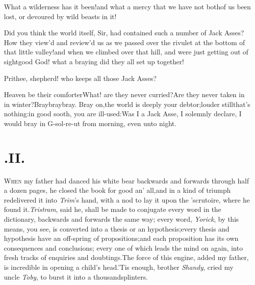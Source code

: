 \documentclass{article}
\begin{document}
\tsh What a wilderness has it been!\break and what a mercy
that we have not both\pb of us been lost, or devoured by wild beasts
in it!

Did you think the world itself, Sir, had contained such a number
of Jack Asses?\tsh How they view’d and
review’d us as we passed over the rivulet at the bottom of
that little valley!\tsh and when we climbed over that
hill, and were just getting out of sight\tsk good God! what a
braying did they all set up together!

\tsh Prithee, shepherd! who keeps all those
Jack Asses? \quad\ast\quad\ast\quad\ast

\tsh Heaven be their comforter\tsh\break What! are
they never curried?\tsh Are they never taken in in
winter?\tsh Bray\break bray\tsk bray. Bray on,\tsk the world
is deeply your debtor;\tsh louder still\tsk\pb that’s
nothing:\tsk in good sooth, you are ill-used:\tsh Was I
a Jack Asse, I solemnly declare, I would bray in G-sol-re-ut from
morning, even unto night.

\section{.\enspace II.}

\lettrine{W}{hen} my father had danced his white bear backwards and forwards through
half a dozen pages, he closed the book for good an’ all,\tsk and in a kind of
triumph redelivered it into \textit{Trim}’s hand, with a nod to lay it upon the
’scrutoire, where he found it.\tsh \textit{Tristram}, said he, shall be made to
conjugate every word in the dictionary, backwards and forwards the same way;\tsh
every word, \textit{Yorick}, by this means, you see, is converted into a thesis or
an hypothesis;\tsk every thesis and hypothesis have an off-\pb spring of
propositions;\tsk and each proposition has its own consequences and conclusions;
every one of which leads the mind on again, into fresh tracks of enquiries and
doubtings.\tsh The force of this engine, added my father, is incredible in opening a
child’s head.\tsh ’Tis enough, brother \textit{Shandy}, cried my uncle
\textit{Toby}, to burst it into a thousand\break splinters.\tsh
\end{document}
